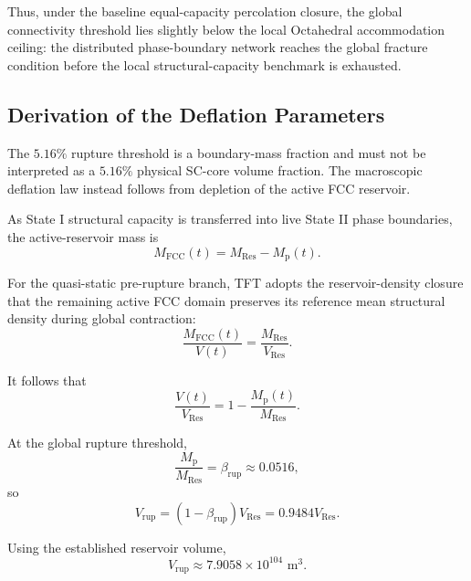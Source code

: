 Thus, under the baseline equal-capacity percolation closure, the global connectivity threshold lies slightly below the local Octahedral accommodation ceiling: the distributed phase-boundary network reaches the global fracture condition before the local structural-capacity benchmark is exhausted.

\subsection{Derivation of the Deflation Parameters}
\label{subsec:deflation_parameters}

The $5.16\%$ rupture threshold is a boundary-mass fraction and must not be interpreted as a $5.16\%$ physical SC-core volume fraction. The macroscopic deflation law instead follows from depletion of the active FCC reservoir.

As State I structural capacity is transferred into live State II phase boundaries, the active-reservoir mass is
\begin{equation}
    M_{\mathrm{FCC}}(t)
    =
    M_{\mathrm{Res}}
    -
    M_{\mathrm{p}}(t).
\end{equation}

For the quasi-static pre-rupture branch, TFT adopts the reservoir-density closure that the remaining active FCC domain preserves its reference mean structural density during global contraction:
\begin{equation}
    \frac{M_{\mathrm{FCC}}(t)}
    {V(t)}
    =
    \frac{M_{\mathrm{Res}}}
    {V_{\mathrm{Res}}}.
\end{equation}

It follows that
\begin{equation}
    \frac{V(t)}{V_{\mathrm{Res}}}
    =
    1-
    \frac{M_{\mathrm{p}}(t)}
    {M_{\mathrm{Res}}}.
\end{equation}

At the global rupture threshold,
\begin{equation}
    \frac{M_{\mathrm{p}}}
    {M_{\mathrm{Res}}}
    =
    \beta_{\mathrm{rup}}
    \approx
    0.0516,
\end{equation}
so
\begin{equation}
    V_{\mathrm{rup}}
    =
    (1-\beta_{\mathrm{rup}})
    V_{\mathrm{Res}}
    =
    0.9484V_{\mathrm{Res}}.
\end{equation}

Using the established reservoir volume,
\begin{equation}
    V_{\mathrm{rup}}
    \approx
    7.9058\times10^{104}
    \text{ m}^3.
\end{equation}

